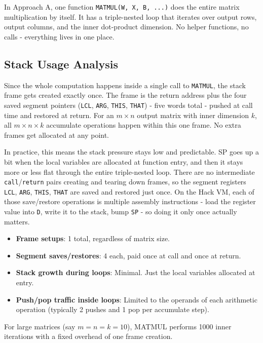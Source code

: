 \documentclass[12pt,a4paper]{article}
\begin{document}
In Approach A, one function \texttt{MATMUL(W, X, B, ...)} does the entire matrix multiplication by itself. It has a triple-nested loop that iterates over output rows, output columns, and the inner dot-product dimension. No helper functions, no calls - everything lives in one place.

\subsection{Stack Usage Analysis}

Since the whole computation happens inside a single call to \texttt{MATMUL}, the stack frame gets created exactly once. The frame is the return address plus the four saved segment pointers (\texttt{LCL}, \texttt{ARG}, \texttt{THIS}, \texttt{THAT}) - five words total - pushed at call time and restored at return. For an $m \times n$ output matrix with inner dimension $k$, all $m \times n \times k$ accumulate operations happen within this one frame. No extra frames get allocated at any point.

In practice, this means the stack pressure stays low and predictable. SP goes up a bit when the local variables are allocated at function entry, and then it stays more or less flat through the entire triple-nested loop. There are no intermediate \texttt{call}/\texttt{return} pairs creating and tearing down frames, so the segment registers \texttt{LCL}, \texttt{ARG}, \texttt{THIS}, \texttt{THAT} are saved and restored just once. On the Hack VM, each of those save/restore operations is multiple assembly instructions - load the register value into \texttt{D}, write it to the stack, bump \texttt{SP} - so doing it only once actually matters.

\begin{itemize}
    \item \textbf{Frame setups}: 1 total, regardless of matrix size.
    \item \textbf{Segment saves/restores}: 4 each, paid once at call and once at return.
    \item \textbf{Stack growth during loops}: Minimal. Just the local variables allocated at entry.
    \item \textbf{Push/pop traffic inside loops}: Limited to the operands of each arithmetic operation (typically 2 pushes and 1 pop per accumulate step).
\end{itemize}

For large matrices (say $m = n = k = 10$), MATMUL performs 1000 inner iterations with a fixed overhead of one frame creation.
\end{document}
